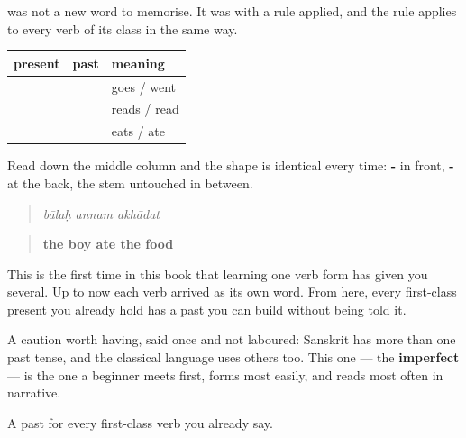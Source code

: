 \begin{grammarlens}[title={Grammar Lens: it is a rule, not a word}]
\textbf{} was not a new word to memorise. It was \textbf{} with a rule applied, and the rule applies to every verb of its class in the same way.

\noindent
\begin{tabularx}{\linewidth}{@{}>{\raggedright\arraybackslash}X>{\raggedright\arraybackslash}X>{\raggedright\arraybackslash}X@{}}
\toprule
\textbf{present} & \textbf{past} & \textbf{meaning} \\
\midrule
\textbf{\sk{गच्छति}} & \textbf{\sk{अगच्छत्}} & goes / went \\
\textbf{\sk{पठति}} & \textbf{\sk{अपठत्}} & reads / read \\
\textbf{\sk{खादति}} & \textbf{\sk{अखादत्}} & eats / ate \\
\bottomrule
\end{tabularx}

Read down the middle column and the shape is identical every time: \textbf{-} in front, \textbf{-} at the back, the stem untouched in between.

\begin{quote}
\textbf{  }
\end{quote}

\begin{quote}
\emph{bālaḥ annam akhādat}
\end{quote}

\begin{quote}
\textbf{the boy ate the food}
\end{quote}

This is the first time in this book that learning one verb form has given you several. Up to now each verb arrived as its own word. From here, every first-class present you already hold has a past you can build without being told it.

A caution worth having, said once and not laboured: Sanskrit has more than one past tense, and the classical language uses others too. This one — the \textbf{imperfect} — is the one a beginner meets first, forms most easily, and reads most often in narrative.
\end{grammarlens}

\begin{grammarlens}[title={What you've built}]
A past for every first-class verb you already say.
\end{grammarlens}

